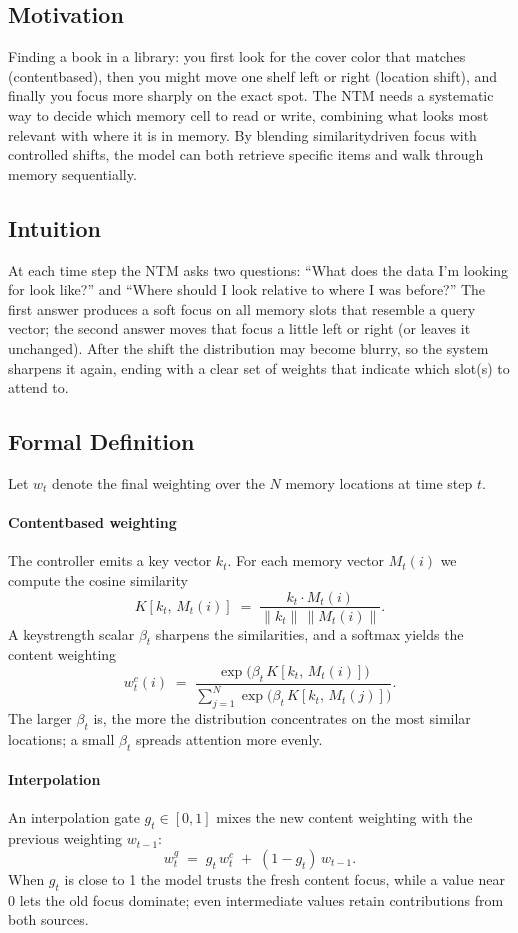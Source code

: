 \documentclass[12pt, a4paper]{article}
\begin{document}
{\subsection{Motivation}
Finding a book in a library: you first look for the cover color that matches (contentbased), then you might move one shelf left or right (location shift), and finally you focus more sharply on the exact spot.  
The NTM needs a systematic way to decide which memory cell to read or write, combining what looks most relevant with where it is in memory.  
By blending similaritydriven focus with controlled shifts, the model can both retrieve specific items and walk through memory sequentially.

\subsection{Intuition}
At each time step the NTM asks two questions: ``What does the data I'm looking for look like?'' and ``Where should I look relative to where I was before?''  
The first answer produces a soft focus on all memory slots that resemble a query vector; the second answer moves that focus a little left or right (or leaves it unchanged).  
After the shift the distribution may become blurry, so the system sharpens it again, ending with a clear set of weights that indicate which slot(s) to attend to.

\subsection{Formal Definition}
Let \(w_t\) denote the final weighting over the \(N\) memory locations at time step \(t\).

\paragraph{Contentbased weighting}
The controller emits a key vector \(k_t\).  
For each memory vector \(M_t(i)\) we compute the cosine similarity
\[
K[k_t,\,M_t(i)] \;=\; \frac{k_t\!\cdot\! M_t(i)}{\|k_t\|\,\|M_t(i)\|}.
\]
A keystrength scalar \(\beta_t\) sharpens the similarities, and a softmax yields the content weighting
\[
w_t^{c}(i)\;=\;
\frac{\exp\!\big(\beta_t\,K[k_t,\,M_t(i)]\big)}
     {\displaystyle\sum_{j=1}^{N}\exp\!\big(\beta_t\,K[k_t,\,M_t(j)]\big)} .
\]
The larger \(\beta_t\) is, the more the distribution concentrates on the most similar locations; a small \(\beta_t\) spreads attention more evenly.

\paragraph{Interpolation}
An interpolation gate \(g_t\in[0,1]\) mixes the new content weighting with the previous weighting \(w_{t-1}\):
\[
w_t^{g}\;=\; g_t\,w_t^{c}\;+\;(1-g_t)\,w_{t-1}.
\]
When \(g_t\) is close to 1 the model trusts the fresh content focus, while a value near 0 lets the old focus dominate; even intermediate values retain contributions from both sources.

}
\end{document}
